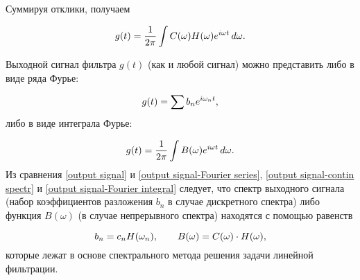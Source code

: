 \begin{enumerate}
Суммируя отклики, получаем

\begin{equation}
	\eqmark{output signal-contin spectr}
	g(t)=\frac{1}{2\pi}\int C(\omega)H(\omega)e^{i\omega t}\,d\omega.
\end{equation}

Выходной сигнал фильтра $g(t)$ (как и любой сигнал) можно представить либо в виде ряда Фурье:

\begin{equation}
	\eqmark{output signal-Fourier series}
	g(t)=\sum b_n e^{i\omega_n t},
\end{equation}
либо в виде интеграла Фурье:

\begin{equation}
	\eqmark{output signal-Fourier integral}
	g(t)=\frac{1}{2\pi}\int B(\omega)e^{i\omega t}\,d\omega.
\end{equation}
Из сравнения \eqref{output signal} и \eqref{output signal-Fourier series}, \eqref{output signal-contin spectr} и \eqref{output signal-Fourier integral} следует, что спектр выходного сигнала (набор коэффициентов
разложения $b_n$ в случае дискретного спектра) либо функция $B(\omega)$ (в случае непрерывного спектра) находятся с
помощью равенств

\begin{equation}
	\eqmark{output signal-spectrum}
	b_n=c_n H(\omega_n),\qquad B(\omega)=C(\omega)\cdot H(\omega),
\end{equation}
которые лежат в основе спектрального метода решения задачи линейной фильтрации.
\end{enumerate}



